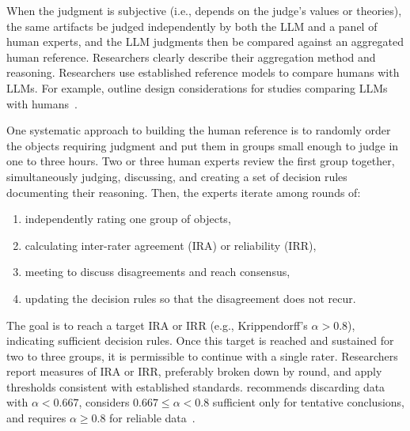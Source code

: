 When the judgment is subjective (i.e., depends on the judge's values or theories), the same artifacts \should be judged independently by both the LLM and a panel of human experts, and the LLM judgments \should then be compared against an aggregated human reference. Researchers \should clearly describe their aggregation method and reasoning.
Researchers \should use established reference models to compare humans with LLMs.
For example, \citeauthor{DBLP:conf/icse/SchneiderFW25} outline design considerations for studies comparing LLMs with humans~\cite{DBLP:conf/icse/SchneiderFW25}.

One systematic approach to building the human reference is to randomly order the objects requiring judgment and put them in groups small enough to judge in one to three hours. Two or three human experts review the first group together, simultaneously judging, discussing, and creating a set of decision rules documenting their reasoning. Then, the experts iterate among rounds of:
\begin{enumerate}
    \item independently rating one group of objects,
    \item calculating inter-rater agreement (IRA) or reliability (IRR),
    \item meeting to discuss disagreements and reach consensus,
    \item updating the decision rules so that the disagreement does not recur.
\end{enumerate}

The goal is to reach a target IRA or IRR (e.g., Krippendorff's $\alpha>0.8$), indicating sufficient decision rules. Once this target is reached and sustained for two to three groups, it is permissible to continue with a single rater.
Researchers \should report measures of IRA or IRR, preferably broken down by round, and \should apply thresholds consistent with established standards. \citeauthor{Krippendorff2018} recommends discarding data with $\alpha<0.667$, considers $0.667 \leq \alpha < 0.8$ sufficient only for tentative conclusions, and requires $\alpha \geq 0.8$ for reliable data~\cite{Krippendorff2018}.

